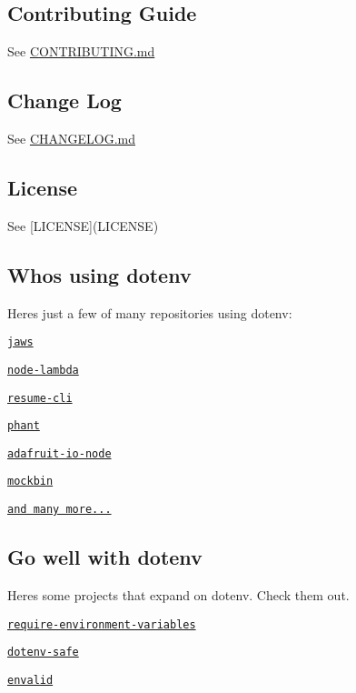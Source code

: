 \subsection*{Contributing Guide}

See \mbox{\hyperlink{readable-stream_2_c_o_n_t_r_i_b_u_t_i_n_g_8md}{C\+O\+N\+T\+R\+I\+B\+U\+T\+I\+NG.md}}

\subsection*{Change Log}

See \mbox{\hyperlink{yargs-parser_2_c_h_a_n_g_e_l_o_g_8md}{C\+H\+A\+N\+G\+E\+L\+OG.md}}

\subsection*{License}

See \mbox{[}L\+I\+C\+E\+N\+SE\mbox{]}(L\+I\+C\+E\+N\+SE)

\subsection*{Who\textquotesingle{}s using dotenv}

Here\textquotesingle{}s just a few of many repositories using dotenv\+:


\begin{DoxyItemize}
\item \href{https://github.com/jaws-framework/jaws-core-js}{\tt jaws}
\item \href{https://github.com/motdotla/node-lambda}{\tt node-\/lambda}
\item \href{https://www.npmjs.com/package/resume-cli}{\tt resume-\/cli}
\item \href{https://www.npmjs.com/package/phant}{\tt phant}
\item \href{https://github.com/adafruit/adafruit-io-node}{\tt adafruit-\/io-\/node}
\item \href{https://www.npmjs.com/package/mockbin}{\tt mockbin}
\item \href{https://www.npmjs.com/browse/depended/dotenv}{\tt and many more...}
\end{DoxyItemize}

\subsection*{Go well with dotenv}

Here\textquotesingle{}s some projects that expand on dotenv. Check them out.


\begin{DoxyItemize}
\item \href{https://github.com/bjoshuanoah/require-environment-variables}{\tt require-\/environment-\/variables}
\item \href{https://github.com/rolodato/dotenv-safe}{\tt dotenv-\/safe}
\item \href{https://github.com/af/envalid}{\tt envalid} 
\end{DoxyItemize}